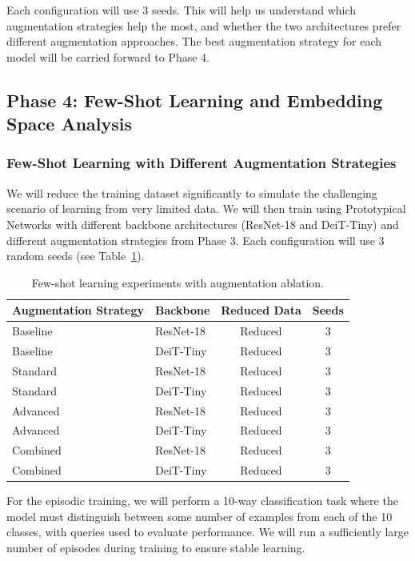 \documentclass[12pt,a4paper]{article}
\begin{document}
Each configuration will use 3 seeds. This will help us understand which augmentation strategies help the most, and whether the two architectures prefer different augmentation approaches. The best augmentation strategy for each model will be carried forward to Phase 4.

\subsection{Phase 4: Few-Shot Learning and Embedding Space Analysis}

\subsubsection{Few-Shot Learning with Different Augmentation Strategies}

We will reduce the training dataset significantly to simulate the challenging scenario of learning from very limited data. We will then train using Prototypical Networks with different backbone architectures (ResNet-18 and DeiT-Tiny) and different augmentation strategies from Phase 3. Each configuration will use 3 random seeds (see Table~\ref{tab:fewshot_experiments}).

\begin{table}[H]
\centering
\caption{Few-shot learning experiments with augmentation ablation.}
\label{tab:fewshot_experiments}
\begin{tabular}{@{}llcc@{}}
\toprule
\textbf{Augmentation Strategy} & \textbf{Backbone} & \textbf{Reduced Data} & \textbf{Seeds} \\
\midrule
Baseline & ResNet-18 & Reduced & 3 \\
Baseline & DeiT-Tiny & Reduced & 3 \\
Standard & ResNet-18 & Reduced & 3 \\
Standard & DeiT-Tiny & Reduced & 3 \\
Advanced & ResNet-18 & Reduced & 3 \\
Advanced & DeiT-Tiny & Reduced & 3 \\
Combined & ResNet-18 & Reduced & 3 \\
Combined & DeiT-Tiny & Reduced & 3 \\
\bottomrule
\end{tabular}
\end{table}

For the episodic training, we will perform a 10-way classification task where the model must distinguish between some number of examples from each of the 10 classes, with queries used to evaluate performance. We will run a sufficiently large number of episodes during training to ensure stable learning.
\end{document}
